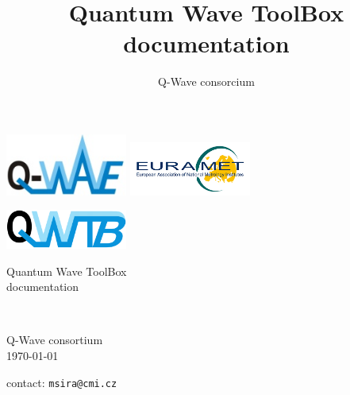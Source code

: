 \documentclass[12pt,a4paper,oneside]{report} %
\begin{document}
\renewcommand\floatpagefraction{.9} \renewcommand\topfraction{.9} \renewcommand\bottomfraction{.9} \renewcommand\textfraction{.1} \setcounter{totalnumber}{50} \setcounter{topnumber}{50} \setcounter{bottomnumber}{50} %
\renewcommand{\labelitemi}{--}          %
\setlength{\unitlength}{1mm}            %


\newenvironment{tightdesc}{\begin{description}[itemsep=0pt]} 
                              {\end{description}}

\title{Quantum Wave ToolBox documentation}
\author{Q-Wave consorcium}

\thispagestyle{empty}
\begin{center}
\includegraphics[width=0.3\textwidth]{sources/qwlogo.jpg}
\hfill
\includegraphics[width=0.3\textwidth]{sources/eurametlogo.jpg}

        \vspace{8em}
        {\huge
        \includegraphics[width=0.3\textwidth]{logo/qwtb_logo.png}

        \vspace{0.5em}
        Quantum Wave ToolBox\\
        documentation}\\

        \vfill
        {\Huge \color{red}{BETA version}}

        \vfill
        {\Large Q-Wave consortium}\\
        \today
        
        \bigskip
        contact: \texttt{msira@cmi.cz}

        \vfill
\end{center}
\newpage
\end{document}
